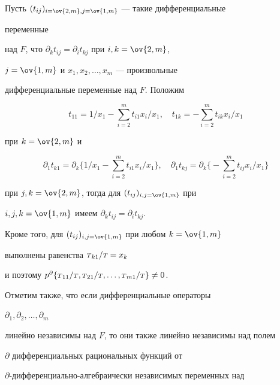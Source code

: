  


\begin{pf} 


Пусть $(t_{ij})_{i=\ov{2,m},j=\ov{1,m}}$ --- такие дифференциальные 


переменные 


над $F$, что $\partial_k t_{ij}=\partial_i t_{kj}$ при $i,k=\ov{2,m}$, 


$j=\ov{1,m}$ и $x_1,x_2,\dotsc,x_m$ --- произвольные 


дифференциальные переменные над $F$. Положим 


$$ 


t_{11}=1/x_1-\sum^m_{i=2}t_{i1}x_i/x_1,\quad 


t_{1k}=-\sum^m_{i=2}t_{ik}x_i/x_1 


$$ 


при $k=\ov{2,m}$ и  


$$ 


\partial_1t_{k1}=\partial_k\Big\{1/x_1- 


\sum^m_{i=2}t_{i1}x_i/x_1\Big\},\quad 


\partial_1t_{kj}=\partial_k\Big\{-\sum^m_{i=2} 


t_{ij}x_i/x_1\Big\} 


$$ 


при $j,k=\ov{2,m}$, тогда для $(t_{ij})_{i,j=\ov{1,m}}$ при 


$i,j,k=\ov{1,m}$ имеем $\partial_k t_{ij}=\partial_i t_{kj}$. 


Кроме того, для $(t_{ij})_{i,j=\ov{1,m}}$ при любом $k=\ov{1,m}$ 


выполнены равенства ${\scriptstyle T}_{k1}/{\scriptstyle T}=x_k$


и поэтому $p^\partial\{\st_{11}/\st,\st_{21}/\st,\dotsc, \linebreak


\st_{m1}/\st\}\ne0$. 


\end{pf} 


 


Отметим также, что если дифференциальные операторы 


$\partial_1,\partial_2,\dotsc,\partial_m$ 


линейно независимы над $F$, то они также линейно независимы над полем  


$\partial$ дифференциальных рациональных функций от 


$\partial$-дифференциально-алгебраически независимых переменных над 


